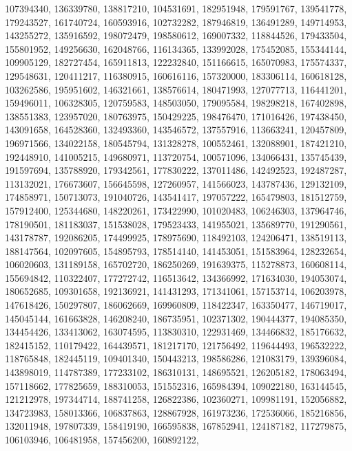 {{    107394340, 136339780, 138817210, 104531691, 182951948, 179591767,
    139541778, 179243527, 161740724, 160593916, 102732282, 187946819,
    136491289, 149714953, 143255272, 135916592, 198072479, 198580612,
    169007332, 118844526, 179433504, 155801952, 149256630, 162048766,
    116134365, 133992028, 175452085, 155344144, 109905129, 182727454,
    165911813, 122232840, 151166615, 165070983, 175574337, 129548631,
    120411217, 116380915, 160616116, 157320000, 183306114, 160618128,
    103262586, 195951602, 146321661, 138576614, 180471993, 127077713,
    116441201, 159496011, 106328305, 120759583, 148503050, 179095584,
    198298218, 167402898, 138551383, 123957020, 180763975, 150429225,
    198476470, 171016426, 197438450, 143091658, 164528360, 132493360,
    143546572, 137557916, 113663241, 120457809, 196971566, 134022158,
    180545794, 131328278, 100552461, 132088901, 187421210, 192448910,
    141005215, 149680971, 113720754, 100571096, 134066431, 135745439,
    191597694, 135788920, 179342561, 177830222, 137011486, 142492523,
    192487287, 113132021, 176673607, 156645598, 127260957, 141566023,
    143787436, 129132109, 174858971, 150713073, 191040726, 143541417,
    197057222, 165479803, 181512759, 157912400, 125344680, 148220261,
    173422990, 101020483, 106246303, 137964746, 178190501, 181183037,
    151538028, 179523433, 141955021, 135689770, 191290561, 143178787,
    192086205, 174499925, 178975690, 118492103, 124206471, 138519113,
    188147564, 102097605, 154895793, 178514140, 141453051, 151583964,
    128232654, 106020603, 131189158, 165702720, 186250269, 191639375,
    115278873, 160608114, 155694842, 110322407, 177272742, 116513642,
    134366992, 171634030, 194053074, 180652685, 109301658, 192136921,
    141431293, 171341061, 157153714, 106203978, 147618426, 150297807,
    186062669, 169960809, 118422347, 163350477, 146719017, 145045144,
    161663828, 146208240, 186735951, 102371302, 190444377, 194085350,
    134454426, 133413062, 163074595, 113830310, 122931469, 134466832,
    185176632, 182415152, 110179422, 164439571, 181217170, 121756492,
    119644493, 196532222, 118765848, 182445119, 109401340, 150443213,
    198586286, 121083179, 139396084, 143898019, 114787389, 177233102,
    186310131, 148695521, 126205182, 178063494, 157118662, 177825659,
    188310053, 151552316, 165984394, 109022180, 163144545, 121212978,
    197344714, 188741258, 126822386, 102360271, 109981191, 152056882,
    134723983, 158013366, 106837863, 128867928, 161973236, 172536066,
    185216856, 132011948, 197807339, 158419190, 166595838, 167852941,
    124187182, 117279875, 106103946, 106481958, 157456200, 160892122,
}}
